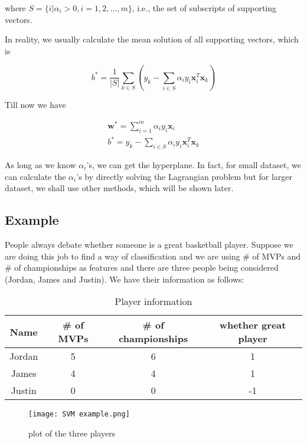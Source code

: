 \documentclass{article}
\begin{document}
where $S = \{i|\alpha_i > 0, i = 1,2,...,m\}$, i.e., the set of subscripts of supporting vectors.

In reality, we usually calculate the mean solution of all supporting vectors, which is

\begin{equation}
b^* = \frac{1}{|S|} \sum_{k \in S}{(y_k - \sum_{i \in S}{\alpha_i y_i \boldsymbol{x}_i^T \boldsymbol{x}_k})}
\end{equation}

Till now we have 

\begin{gather*}
\boldsymbol{w}^* = \sum_{i=1}^{m}{\alpha_i y_i \boldsymbol{x}_i} \\
b^* = y_k - \sum_{i \in S}{\alpha_i y_i \boldsymbol{x}_i^T \boldsymbol{x}_k}
\end{gather*}

As long as we know $\alpha_i$'s, we can get the hyperplane. In fact, for small dataset, we can calculate the $\alpha_i$'s by directly solving the Lagrangian problem but for larger dataset, we shall use other methods, which will be shown later.

\subsection{Example}

People always debate whether someone is a great basketball player. Suppose we are doing this job to find a way of classification and we are using \# of MVPs and \# of championships as features and there are three people being considered (Jordan, James and Justin). We have their information as follows:

\begin{table}[H]
\centering
\caption{Player information}
\begin{tabular}{cccc}
\hline
\textbf{Name} & \textbf{\# of MVPs} & \textbf{\# of championships} & \textbf{whether great player} \\ \hline
Jordan & 5 &    6     & 1        \\
James & 4  & 4  & 1       \\
Justin & 0 & 0 & -1  \\ \hline
\end{tabular}
\end{table}

\begin{figure}[H]
\centering
\texttt{[image: SVM example.png]}
\caption{plot of the three players}
\label{fig6}
\end{figure}
\end{document}
